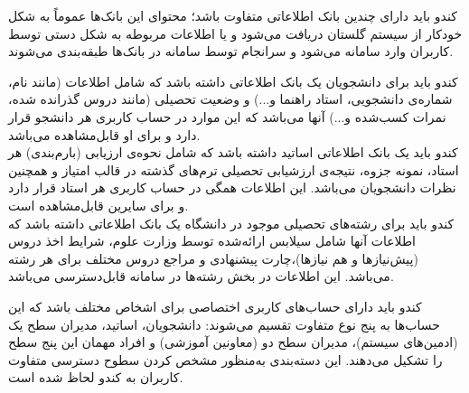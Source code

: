 \documentclass{report}
\begin{document}
\hypertarget{one}{}
کندو باید دارای چندین بانک اطلاعاتی متفاوت باشد؛ محتوای این بانک‌ها عموماً به شکل خودکار از سیستم گلستان دریافت می‌شود و یا اطلاعات مربوطه به شکل دستی توسط کاربران  وارد سامانه می‌شود و سرانجام توسط سامانه در بانک‌ها طبقه‌بندی می‌شوند.
\begin{adjustwidth}{2em}{0pt}
           کندو باید برای دانشجویان یک بانک اطلاعاتی داشته باشد که شامل اطلاعات (مانند نام، شماره‌ی دانشجویی، استاد راهنما و...) و وضعیت تحصیلی (مانند دروس گذرانده شده، نمرات کسب‌شده و...)         آنها می‌باشد که  این موارد در حساب کاربری هر دانشجو قرار دارد و برای او قابل‌مشاهده می‌باشد.
\\  
 کندو باید یک بانک اطلاعاتی اساتید داشته باشد که شامل نحوه‌ی ارزیابی (بارم‌بندی) هر استاد، نمونه جزوه، نتیجه‌ی ارزشیابی تحصیلی ترم‌های گذشته در قالب امتیاز و همچنین نظرات دانشجویان می‌باشد. این اطلاعات همگی در حساب کاربری هر استاد قرار دارد و برای سایرین قابل‌مشاهده است.
\\
          کندو باید برای رشته‌های تحصیلی موجود در دانشگاه یک بانک اطلاعاتی داشته باشد که اطلاعات آنها شامل سیلابس ارائه‌شده توسط وزارت علوم، شرایط اخذ دروس (پیش‌نیازها و هم نیازها)،چارت پیشنهادی و مراجع دروس مختلف برای هر رشته  می‌باشد. این اطلاعات در بخش رشته‌ها در سامانه قابل‌دسترسی می‌باشد.       
\end{adjustwidth}
\hypertarget{ww}{}
کندو باید دارای حساب‌های کاربری اختصاصی برای اشخاص مختلف باشد که این حساب‌ها به پنج نوع متفاوت تقسیم می‌شوند: دانشجویان، اساتید، مدیران سطح یک (ادمین‌های سیستم)، مدیران سطح دو (معاونین آموزشی) و افراد مهمان این پنج سطح را تشکیل می‌دهند. این دسته‌بندی به‌منظور مشخص کردن سطوح دسترسی متفاوت کاربران به کندو لحاظ شده است.
\end{document}
